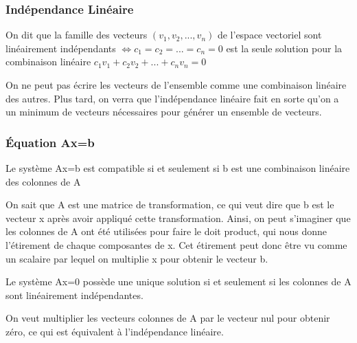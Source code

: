 \documentclass{article}
\begin{document}
\subsubsection{Indépendance Linéaire}

\begin{definition}
    On dit que la famille des vecteurs $(v_1, v_2, ..., v_n)$ de l'espace
    vectoriel sont linéairement indépendants $\Longleftrightarrow
    c_1 = c_2 = ... = c_n = 0$ est la seule solution pour la combinaison
    linéaire $ c_1 v_1 + c_2 v_2 + ... + c_n v_n = 0$
\end{definition}

\begin{intuition}
    On ne peut pas écrire les vecteurs de l'ensemble comme une combinaison
    linéaire des autres. Plus tard, on verra que l'indépendance linéaire
    fait en sorte qu'on a un minimum de vecteurs nécessaires pour générer
    un ensemble de vecteurs.
\end{intuition}

\subsubsection{Équation Ax=b}

\begin{theorem}[Compatibilité de Ax=b]
    Le système Ax=b est compatible si et seulement si b est une combinaison
    linéaire des colonnes de A
\end{theorem}

\begin{intuition}
    On sait que A est une matrice de transformation, ce qui veut dire que b
    est le vecteur x après avoir appliqué cette transformation. Ainsi,
    on peut s'imaginer que les colonnes de A ont été utilisées pour faire
    le doit product, qui nous donne l'étirement de chaque composantes de x.
    Cet étirement peut donc être vu comme un scalaire par lequel on
    multiplie x pour obtenir le vecteur b.
\end{intuition}

\begin{theorem}
    Le système Ax=0 possède une unique solution si et seulement si les
    colonnes de A sont linéairement indépendantes.
\end{theorem}

\begin{intuition}
    On veut multiplier les vecteurs colonnes de A par le vecteur nul pour
    obtenir zéro, ce qui est équivalent à l'indépendance linéaire.
\end{intuition}
\end{document}
